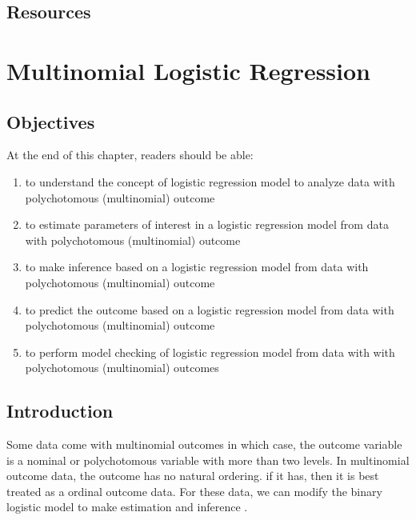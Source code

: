 \documentclass[
  10pt,
]{krantz}
\providecommand{\tightlist}{%
  \setlength{\itemsep}{0pt}\setlength{\parskip}{0pt}}
\begin{document}
\hypertarget{resources-2}{%
\section{Resources}\label{resources-2}}

\hypertarget{multinomial-logistic-regression}{%
\chapter{Multinomial Logistic Regression}\label{multinomial-logistic-regression}}

\hypertarget{objectives-7}{%
\section{Objectives}\label{objectives-7}}

At the end of this chapter, readers should be able:

\begin{enumerate}
\def\labelenumi{\arabic{enumi}.}
\tightlist
\item
  to understand the concept of logistic regression model to analyze data with polychotomous (multinomial) outcome
\item
  to estimate parameters of interest in a logistic regression model from data with polychotomous (multinomial) outcome
\item
  to make inference based on a logistic regression model from data with polychotomous (multinomial) outcome
\item
  to predict the outcome based on a logistic regression model from data with polychotomous (multinomial) outcome
\item
  to perform model checking of logistic regression model from data with with polychotomous (multinomial) outcomes
\end{enumerate}

\hypertarget{introduction-4}{%
\section{Introduction}\label{introduction-4}}

Some data come with multinomial outcomes in which case, the outcome variable is a nominal or polychotomous variable with more than two levels. In multinomial outcome data, the outcome has no natural ordering. if it has, then it is best treated as a ordinal outcome data. For these data, we can modify the binary logistic model to make estimation and inference \citetext{\citealp[ ]{kleinbaum2010logistic}; \citealp{Hosmer2013-03-22}}.
\end{document}

